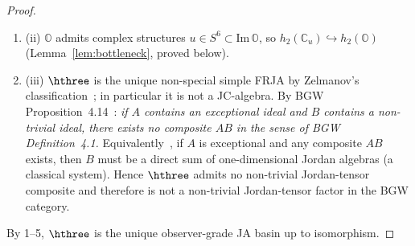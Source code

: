 \begin{proof}
\begin{enumerate}
\begin{enumerate}[label=(\alph*)]
        $\hthree$ have Peirce 0-space $V_0(E)\cong h_2(\mathbb{O})$
        (Proposition~\ref{prop:peirce-spaces}).
      \item (ii) $\mathbb{O}$ admits complex structures $u\in S^6
        \subset\mathrm{Im}\,\mathbb{O}$, so
        $h_2(\mathbb{C}_u)\hookrightarrow h_2(\mathbb{O})$
        (Lemma~\ref{lem:bottleneck}, proved below).
      \item (iii) $\hthree$ is the unique non-special simple FRJA
        by Zelmanov's classification~\cite{Zelmanov1979}; in
        particular it is not a JC-algebra.  By BGW
        Proposition~4.14~\cite{BGW2020}: \emph{if $A$ contains an
        exceptional ideal and $B$ contains a non-trivial ideal,
        there exists no composite $AB$ in the sense of BGW
        Definition~4.1.}  Equivalently~\cite[remark following
        Prop.~4.14]{BGW2020}, if $A$ is exceptional and any
        composite $AB$ exists, then $B$ must be a direct sum of
        one-dimensional Jordan algebras (a classical system).
        Hence $\hthree$ admits no non-trivial Jordan-tensor
        composite and therefore is not a non-trivial Jordan-tensor
        factor in the BGW category.
    \end{enumerate}
\end{enumerate}
By 1--5, $\hthree$ is the unique observer-grade JA basin up to
isomorphism.
\end{proof}

